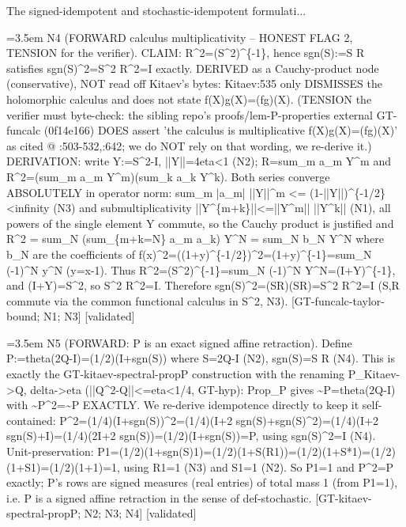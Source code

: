 \documentclass{article}
\newcommand{\step}[1]{\par\noindent\hangindent=3.5em\hangafter=1%
  \makebox[3.5em][l]{\textbf{#1.}}}
\newcommand{\steptag}[1]{\hfill{\small\textsf{[#1]}}}
\begin{document}
\begin{proofbox}{The signed-idempotent and stochastic-idempotent formulati...}
\step{1.4} N4 (FORWARD calculus multiplicativity -- HONEST FLAG 2, TENSION for the verifier). CLAIM: R\textasciicircum{}2=(S\textasciicircum{}2)\textasciicircum{}\{-1\}, hence sgn(S):=S R satisfies sgn(S)\textasciicircum{}2=S\textasciicircum{}2 R\textasciicircum{}2=I exactly. DERIVED as a Cauchy-product node (conservative), NOT read off Kitaev's bytes: Kitaev:535 only DISMISSES the holomorphic calculus and does not state f(X)g(X)=(fg)(X). (TENSION the verifier must byte-check: the sibling repo's proofs/lem-P-properties external GT-funcalc (0f14e166) DOES assert 'the calculus is multiplicative f(X)g(X)=(fg)(X)' as cited @ :503-532,:642; we do NOT rely on that wording, we re-derive it.) DERIVATION: write Y:=S\textasciicircum{}2-I, ||Y||=4eta<1 (N2); R=sum\_m a\_m Y\textasciicircum{}m and R\textasciicircum{}2=(sum\_m a\_m Y\textasciicircum{}m)(sum\_k a\_k Y\textasciicircum{}k). Both series converge ABSOLUTELY in operator norm: sum\_m |a\_m| ||Y||\textasciicircum{}m <= (1-||Y||)\textasciicircum{}\{-1/2\}<infinity (N3) and submultiplicativity ||Y\textasciicircum{}\{m+k\}||<=||Y\textasciicircum{}m|| ||Y\textasciicircum{}k|| (N1), all powers of the single element Y commute, so the Cauchy product is justified and R\textasciicircum{}2 = sum\_N (sum\_\{m+k=N\} a\_m a\_k) Y\textasciicircum{}N = sum\_N b\_N Y\textasciicircum{}N where b\_N are the coefficients of f(x)\textasciicircum{}2=((1+y)\textasciicircum{}\{-1/2\})\textasciicircum{}2=(1+y)\textasciicircum{}\{-1\}=sum\_N (-1)\textasciicircum{}N y\textasciicircum{}N (y=x-1). Thus R\textasciicircum{}2=(S\textasciicircum{}2)\textasciicircum{}\{-1\}=sum\_N (-1)\textasciicircum{}N Y\textasciicircum{}N=(I+Y)\textasciicircum{}\{-1\}, and (I+Y)=S\textasciicircum{}2, so S\textasciicircum{}2 R\textasciicircum{}2=I. Therefore sgn(S)\textasciicircum{}2=(SR)(SR)=S\textasciicircum{}2 R\textasciicircum{}2=I (S,R commute via the common functional calculus in S\textasciicircum{}2, N3). [GT-funcalc-taylor-bound; N1; N3] \steptag{validated} \\[4pt]
\step{1.5} N5 (FORWARD: P is an exact signed affine retraction). Define P:=theta(2Q-I)=(1/2)(I+sgn(S)) where S=2Q-I (N2), sgn(S)=S R (N4). This is exactly the GT-kitaev-spectral-propP construction with the renaming P\_Kitaev->Q, delta->eta (||Q\textasciicircum{}2-Q||<=eta<1/4, GT-hyp): Prop\_P gives \textasciitilde{}P=theta(2Q-I) with \textasciitilde{}P\textasciicircum{}2=\textasciitilde{}P EXACTLY. We re-derive idempotence directly to keep it self-contained: P\textasciicircum{}2=(1/4)(I+sgn(S))\textasciicircum{}2=(1/4)(I+2 sgn(S)+sgn(S)\textasciicircum{}2)=(1/4)(I+2 sgn(S)+I)=(1/4)(2I+2 sgn(S))=(1/2)(I+sgn(S))=P, using sgn(S)\textasciicircum{}2=I (N4). Unit-preservation: P1=(1/2)(1+sgn(S)1)=(1/2)(1+S(R1))=(1/2)(1+S*1)=(1/2)(1+S1)=(1/2)(1+1)=1, using R1=1 (N3) and S1=1 (N2). So P1=1 and P\textasciicircum{}2=P exactly; P's rows are signed measures (real entries) of total mass 1 (from P1=1), i.e. P is a signed affine retraction in the sense of def-stochastic. [GT-kitaev-spectral-propP; N2; N3; N4] \steptag{validated} \\[4pt]

\end{proofbox}
\end{document}
